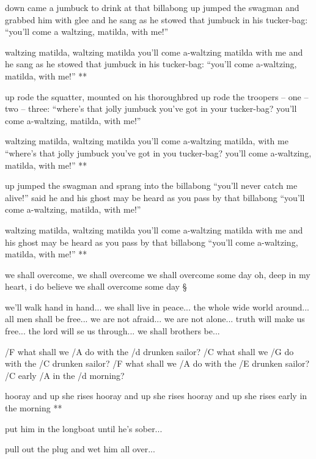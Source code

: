 down came a jumbuck to drink at that billabong
up jumped the swagman and grabbed him with glee
and he sang as he stowed that jumbuck in his tucker-bag:
``you'll come a waltzing, matilda, with me!''

\R  waltzing matilda, waltzing matilda
    you'll come a-waltzing matilda with me
    and he sang as he stowed that jumbuck in his tucker-bag:
    ``you'll come a-waltzing, matilda, with me!'' **

up rode the squatter, mounted on his thoroughbred
up rode the troopers -- one -- two -- three:
``where's that jolly jumbuck you've got in your tucker-bag?
you'll come a-waltzing, matilda, with me!''

\R  waltzing matilda, waltzing matilda
    you'll come a-waltzing matilda, with me
    ``where's that jolly jumbuck you've got in you tucker-bag?
    you'll come a-waltzing, matilda, with me!'' **

up jumped the swagman and sprang into the billabong
``you'll never catch me alive!'' said he
and his ghost may be heard as you pass by that billabong
``you'll come a-waltzing, matilda, with me!''

\R  waltzing matilda, waltzing matilda
    you'll come a-waltzing matilda with me
    and his ghost may be heard as you pass by that billabong
    ``you'll come a-waltzing, matilda, with me!'' **




we shall overcome, we shall overcome
we shall overcome some day
oh, deep in my heart, i do believe
we shall overcome some day \S

we'll walk hand in hand...
we shall live in peace...
the whole wide world around...
all men shall be free...
we are not afraid...
we are not alone...
truth will make us free...
the lord will se us through...
we shall brothers be...




/F what shall we /A do with the /d drunken sailor?
/C what shall we /G do with the /C drunken sailor?
/F what shall we /A do with the /E drunken sailor?
/C early /A in the /d morning?

\R  hooray and up she rises
    hooray and up she rises
    hooray and up she rises
    early in the morning **

put him in the longboat until he's sober... \s

pull out the plug and wet him all over... \s

